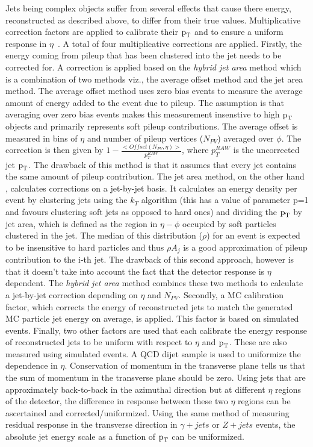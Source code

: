 Jets being complex objects suffer from several effects that cause there energy, reconstructed as described above, to differ from their true values. Multiplicative correction factors are applied to calibrate their $\text{p}_\text{T}$ and to ensure a uniform response in $\eta$~\cite{jet_recon1,jet_recon2}. A total of four multiplicative corrections are applied. Firstly, the energy coming from pileup that has been clustered into the jet needs to be corrected for. A correction is applied based on the \textit{hybrid jet area} method which is a combination of two methods viz., the average offset method and the jet area method. The average offset method uses zero bias events to measure the average amount of energy added to the event due to pileup. The assumption is that averaging over zero bias events makes this measurement insenstive to high $\text{p}_\text{T}$ objects and primarily represents soft pileup contributions. The average offset is measured in bins of $\eta$ and number of pileup vertices ($N_{PV}$) averaged over $\phi$. The correction is then given by $1-\frac{<Offset(N_{PV},\eta)>}{p_{T}^{RAW}}$, where $p_{T}^{RAW}$  is the uncorrected jet $\text{p}_\text{T}$. The drawback of this method is that it assumes that every jet contains the same amount of pileup contribution. The jet area method, on the other hand , calculates corrections on a jet-by-jet basis. It calculates an energy density  per event  by clustering jets using the $k_{T}$ algorithm (this has a value of parameter p=1 and favours clustering soft jets as opposed to hard ones) and dividing the $\text{p}_\text{T}$ by jet area, which is defined as the region in $\eta-\phi$ occupied by soft particles clustered in the jet. The median of this distribution ($\rho$) for an event is expected to be insensitive to hard particles and thus $\rho A_{j}$ is a good approximation of pileup contribution to the i-th jet. The drawback of this second approach, however is that it doesn't take into account the fact that the detector response is $\eta$ dependent. The \textit{hybrid jet area} method combines these two methods to calculate a jet-by-jet correction depending on $\eta$ and $N_{PV}$. Secondly, a MC calibration factor, which corrects the energy of reconstructed jets to match the generated MC particle jet energy on average, is applied. This factor is based on simulated events. Finally, two other factors are used that each calibrate the energy response of reconstructed jets to be uniform with respect to $\eta$ and $\text{p}_\text{T}$. These are also measured using simulated events. A QCD dijet sample is used to uniformize the dependence in $\eta$. Conservation of momentum in the transverse plane tells us that the sum of momentum in the transverse plane should be zero. Using jets that are approximately back-to-back in the azimuthal direction but at different $\eta$ regions of the detector, the difference in response between these two $\eta$ regions can be ascertained and corrected/uniformized. Using the same method of measuring residual response in the transverse direction in $\gamma + jets$ or $Z +jets$  events, the absolute jet energy scale as a function of $\text{p}_\text{T}$ can be uniformized.



